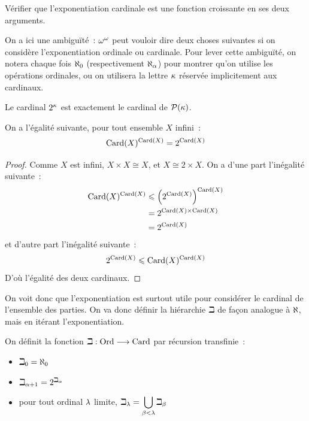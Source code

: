 \begin{exercise}
  Vérifier que l'exponentiation cardinale est une fonction croissante en ses
  deux arguments.
\end{exercise}

\begin{notation}
  On a ici une ambiguïté~: $\omega^\omega$ peut vouloir dire deux choses
  suivantes si on considère l'exponentiation ordinale ou cardinale. Pour lever
  cette ambiguïté, on notera chaque fois $\aleph_0$ (respectivement
  $\aleph_\alpha$) pour montrer qu'on utilise les opérations ordinales, ou on
  utilisera la lettre $\kappa$ réservée implicitement aux cardinaux.
\end{notation}

\begin{remark}
  Le cardinal $2^\kappa$ est exactement le cardinal de $\mathcal{P}(\kappa)$.
\end{remark}

\begin{proposition}
  On a l'égalité suivante, pour tout ensemble $X$ infini~:
  \[\operatorname{Card}(X)^{\operatorname{Card}(X)} = 2^{\operatorname{Card}(X)}\]
\end{proposition}

\begin{proof}
  Comme $X$ est infini, $X\times X \cong X$, et $X \cong 2\times X$. On a d'une
  part l'inégalité suivante~:
  \begin{align*}
    \operatorname{Card}(X)^{\operatorname{Card}(X)} &\leqslant \left(2^{\operatorname{Card}(X)}\right)^{\operatorname{Card}(X)} \\
    &= 2^{\operatorname{Card}(X)\times\operatorname{Card}(X)} \\
    &= 2^{\operatorname{Card}(X)}
  \end{align*}
  et d'autre part l'inégalité suivante~: \[2^{\operatorname{Card}(X)}\leqslant \operatorname{Card}(X)^{\operatorname{Card}(X)}\]
  D'où l'égalité des deux cardinaux.
\end{proof}

On voit donc que l'exponentiation est surtout utile pour considérer le cardinal
de l'ensemble des parties. On va donc définir la hiérarchie $\Cbe$ de façon
analogue à $\aleph$, mais en itérant l'exponentiation.

\begin{definition}
  On définit la fonction $\beth : \displaystyle \operatorname{Ord} \longrightarrow \operatorname{Card}$ par récursion
    transfinie~:
  \begin{itemize}
  \item $\beth_0 = \aleph_0$
  \item $\beth_{\alpha + 1} = 2^{\beth_\alpha}$
  \item pour tout ordinal $\lambda$ limite,
    $\displaystyle\beth_\lambda = \bigcup_{\beta < \lambda} \beth_\beta$
  \end{itemize}
  \index[notation]{$\Cbe$}
\end{definition}

